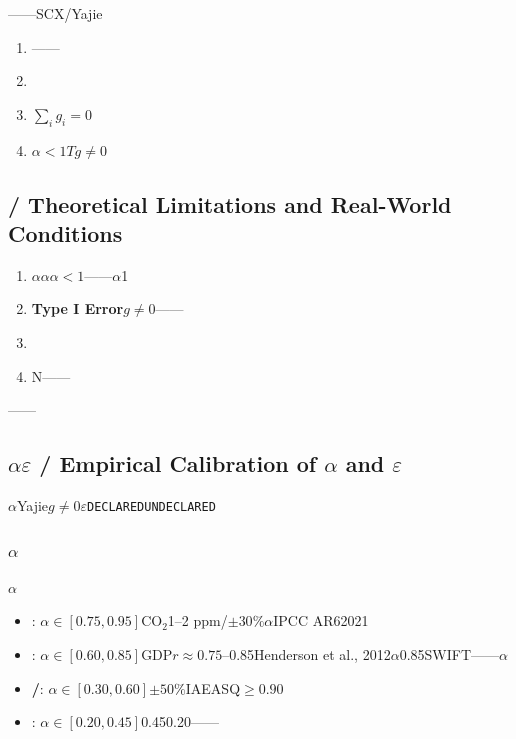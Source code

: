 \documentclass[12pt,a4paper]{article}
\theoremstyle{remark}
\newcommand{\UNDECLARED}{\texttt{UNDECLARED}}
\newcommand{\DECLARED}{\texttt{DECLARED}}
\begin{document}
——SCX/Yajie

\begin{enumerate}[label=(\arabic*)]
    \item \textbf{}——
    \item \textbf{}
    \item \textbf{}$\sum_i g_i = 0$
    \item \textbf{}$\alpha < 1$$T$$g \neq 0$
\end{enumerate}

\subsection{ / Theoretical Limitations and Real-World Conditions}



\begin{enumerate}[label=(\arabic*)]
    \item \textbf{$\alpha$}$\alpha$$\alpha < 1$——$\alpha$1
    \item \textbf{Type I Error}$g \neq 0$——
    \item \textbf{}
    \item \textbf{}N——
\end{enumerate}

——

\subsection{$\alpha$$\varepsilon$ / Empirical Calibration of $\alpha$ and $\varepsilon$}

$\alpha$Yajie$g \neq 0$$\varepsilon$\DECLARED{}\UNDECLARED{}

\subsubsection{$\alpha$}

$\alpha$

\begin{itemize}[nosep]
    \item \textbf{}: $\alpha \in [0.75, 0.95]$CO$_2$1--2 ppm/$\pm 30\%$$\alpha$IPCC AR62021
    \item \textbf{}: $\alpha \in [0.60, 0.85]$GDP$r \approx 0.75$--0.85Henderson et al., 2012$\alpha$0.85SWIFT——$\alpha$
    \item \textbf{/}: $\alpha \in [0.30, 0.60]$$\pm 50\%$IAEASQ$\geq 0.90$
    \item \textbf{}: $\alpha \in [0.20, 0.45]$0.450.20——
\end{itemize}
\end{document}
